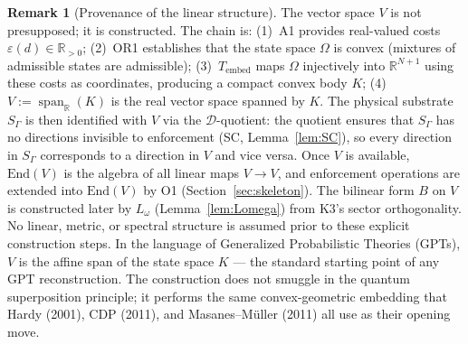 \documentclass[11pt,a4paper]{article}
\theoremstyle{definition}
\newtheorem{remark}[theorem]{Remark}
\newcommand{\eps}{\varepsilon}
\newcommand{\End}{\mathrm{End}}
\DeclareMathOperator{\spn}{span}
\begin{document}
\begin{remark}[Provenance of the linear structure]\label{rem:linearity}
The vector space $V$ is not presupposed; it is constructed.  The chain is: (1)~A1 provides real-valued costs $\eps(d) \in \mathbb{R}_{>0}$; (2)~OR1 establishes that the state space $\Omega$ is convex (mixtures of admissible states are admissible); (3)~$T_{\mathrm{embed}}$ maps $\Omega$ injectively into $\mathbb{R}^{N+1}$ using these costs as coordinates, producing a compact convex body $K$; (4)~$V := \spn_\mathbb{R}(K)$ is the real vector space spanned by $K$.  The physical substrate $S_\Gamma$ is then identified with $V$ via the $\mathcal{D}$-quotient: the quotient ensures that $S_\Gamma$ has no directions invisible to enforcement (SC, Lemma~\ref{lem:SC}), so every direction in $S_\Gamma$ corresponds to a direction in $V$ and vice versa.  Once $V$ is available, $\End(V)$ is the algebra of all linear maps $V \to V$, and enforcement operations are extended into $\End(V)$ by O1 (Section~\ref{sec:skeleton}).  The bilinear form $B$ on $V$ is constructed later by $L_\omega$ (Lemma~\ref{lem:Lomega}) from K3's sector orthogonality.  No linear, metric, or spectral structure is assumed prior to these explicit construction steps.  In the language of Generalized Probabilistic Theories (GPTs), $V$ is the affine span of the state space $K$ --- the standard starting point of any GPT reconstruction.  The construction does not smuggle in the quantum superposition principle; it performs the same convex-geometric embedding that Hardy (2001), CDP (2011), and Masanes--M\"uller (2011) all use as their opening move.
\end{remark}
\end{document}
